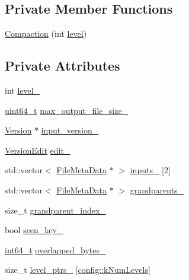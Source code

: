 \subsection*{Private Member Functions}
\begin{DoxyCompactItemize}
\item 
\hyperlink{classleveldb_1_1_compaction_adc68ea88defa6187764838e73836b9e6}{Compaction} (int \hyperlink{classleveldb_1_1_compaction_aaf72769cc8dabece3e513399425f91fa}{level})
\end{DoxyCompactItemize}
\subsection*{Private Attributes}
\begin{DoxyCompactItemize}
\item 
int \hyperlink{classleveldb_1_1_compaction_a773153291660bb827362f2290dcc54c1}{level\-\_\-}
\item 
\hyperlink{stdint_8h_aaa5d1cd013383c889537491c3cfd9aad}{uint64\-\_\-t} \hyperlink{classleveldb_1_1_compaction_a15c8ad7b57cd233f1c712ad12aa65163}{max\-\_\-output\-\_\-file\-\_\-size\-\_\-}
\item 
\hyperlink{classleveldb_1_1_version}{Version} $\ast$ \hyperlink{classleveldb_1_1_compaction_a8671451e616a9553121d554c096f90ad}{input\-\_\-version\-\_\-}
\item 
\hyperlink{classleveldb_1_1_version_edit}{Version\-Edit} \hyperlink{classleveldb_1_1_compaction_a425d0ea6460c070e11711a8ca06c68fa}{edit\-\_\-}
\item 
std\-::vector$<$ \hyperlink{structleveldb_1_1_file_meta_data}{File\-Meta\-Data} $\ast$ $>$ \hyperlink{classleveldb_1_1_compaction_ae4134d8076b7b3657151e077c394acfc}{inputs\-\_\-} \mbox{[}2\mbox{]}
\item 
std\-::vector$<$ \hyperlink{structleveldb_1_1_file_meta_data}{File\-Meta\-Data} $\ast$ $>$ \hyperlink{classleveldb_1_1_compaction_a7b2b689910416375addbeeef11d4b01d}{grandparents\-\_\-}
\item 
size\-\_\-t \hyperlink{classleveldb_1_1_compaction_a852631569cc903b8b37f524a86a397e1}{grandparent\-\_\-index\-\_\-}
\item 
bool \hyperlink{classleveldb_1_1_compaction_adb523506dfa03c896a813d1248899da8}{seen\-\_\-key\-\_\-}
\item 
\hyperlink{stdint_8h_adec1df1b8b51cb32b77e5b86fff46471}{int64\-\_\-t} \hyperlink{classleveldb_1_1_compaction_ae70f3aa618e8db3610726f6684b80335}{overlapped\-\_\-bytes\-\_\-}
\item 
size\-\_\-t \hyperlink{classleveldb_1_1_compaction_a64265c8ae55ac34be8e81d9cb1ea22b5}{level\-\_\-ptrs\-\_\-} \mbox{[}\hyperlink{namespaceleveldb_1_1config_ab6017947ae68898c606643bddc0f5b9c}{config\-::k\-Num\-Levels}\mbox{]}
\end{DoxyCompactItemize}
